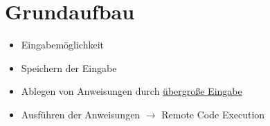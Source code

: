 \section{Grundaufbau}
    \begin{itemize}
        \item Eingabemöglichkeit
        \item Speichern der Eingabe
        \item Ablegen von Anweisungen durch \underline{übergroße Eingabe}  
        \item Ausführen der Anweisungen $\rightarrow$ Remote Code Execution
    \end{itemize}
